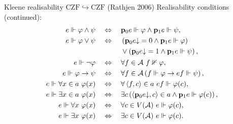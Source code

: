 \documentclass{beamer}
\theoremstyle{definition}
\newcommand{\tuple}[1]{\left\langle #1 \right\rangle}
\newcommand{\CZF}{\mathrm{CZF}}
\begin{document}
\begin{frame}{Kleene realisability $\CZF \hookrightarrow \CZF$ (Rathjen 2006)}
  Realisability conditions (continued):
  \begin{align*}
    e \Vdash \varphi \land \psi \quad                        & \Leftrightarrow \quad \mathbf{p}_0e \Vdash \varphi \land \mathbf{p}_1e \Vdash \psi,                                                         \\
    e \Vdash \varphi \lor \psi \quad                         & \Leftrightarrow \quad \begin{aligned}[t]
                                                                                        & \left(\mathbf{p}_0e {\downarrow} = 0 \land \mathbf{p}_1e \Vdash \varphi\right)       \\
                                                                                        & {} \lor \left(\mathbf{p}_0e {\downarrow} = 1 \land \mathbf{p}_1e \Vdash \psi\right),
                                                                                     \end{aligned}                               \\
    e \Vdash \neg \varphi \quad                              & \Leftrightarrow \quad \forall f \in \mathcal{A} \ f \nVdash \varphi,                                                                        \\
    e \Vdash \varphi \rightarrow \psi \quad                  & \Leftrightarrow \quad \forall f \in \mathcal{A} \left(f \Vdash \varphi \rightarrow ef \Vdash \psi\right),                                   \\
    e \Vdash \forall x \in a \ \varphi\mleft(x\mright) \quad & \Leftrightarrow \quad \forall \tuple{f, c} \in a \ ef  \Vdash \varphi\mleft(c\mright),                                                      \\
    e \Vdash \exists x \in a \ \varphi\mleft(x\mright) \quad & \Leftrightarrow \quad \exists c\left(\tuple{\mathbf{p}_0e {\downarrow}, c} \in a \land \mathbf{p}_1e \Vdash \varphi\mleft(c\mright)\right), \\
    e \Vdash \forall x \ \varphi\mleft(x\mright) \quad       & \Leftrightarrow \quad \forall c \in V\mleft(\mathcal{A}\mright) \ e \Vdash \varphi\mleft(c\mright),                                         \\
    e \Vdash \exists x \ \varphi\mleft(x\mright) \quad       & \Leftrightarrow \quad \exists c \in V\mleft(\mathcal{A}\mright) \ e \Vdash \varphi\mleft(c\mright).
  \end{align*}
\end{frame}
\end{document}
